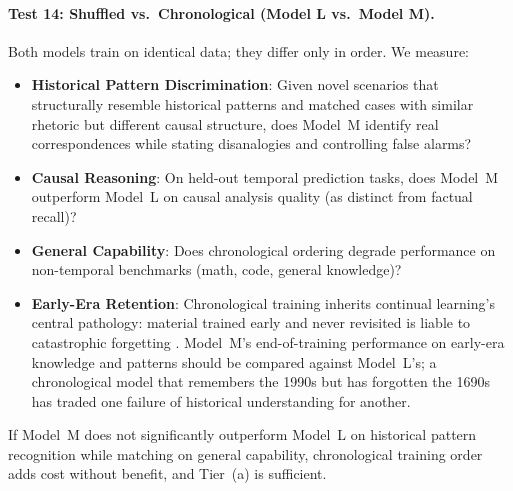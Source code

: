 \paragraph{Test 14: Shuffled vs.\ Chronological (Model L vs.\ Model M).}
Both models train on identical data; they differ only in order. We measure:
\begin{itemize}
    \item \textbf{Historical Pattern Discrimination}: Given novel scenarios
    that structurally resemble historical patterns and matched cases with
    similar rhetoric but different causal structure, does Model~M identify real
    correspondences while stating disanalogies and controlling false alarms?
    \item \textbf{Causal Reasoning}: On held-out temporal prediction tasks, does Model~M outperform Model~L on causal analysis quality (as distinct from factual recall)?
    \item \textbf{General Capability}: Does chronological ordering degrade performance on non-temporal benchmarks (math, code, general knowledge)?
    \item \textbf{Early-Era Retention}: Chronological training inherits continual learning's central pathology: material trained early and never revisited is liable to catastrophic forgetting \cite{vandeven2024continuallearningcatastrophicforgetting}. Model~M's end-of-training performance on early-era knowledge and patterns should be compared against Model~L's; a chronological model that remembers the 1990s but has forgotten the 1690s has traded one failure of historical understanding for another.
\end{itemize}
If Model~M does not significantly outperform Model~L on historical pattern recognition while matching on general capability, chronological training order adds cost without benefit, and Tier~(a) is sufficient.

